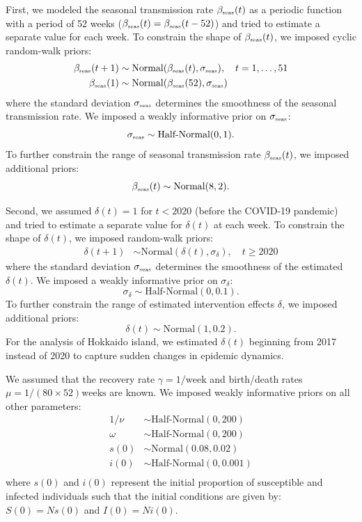 \documentclass[12pt]{article}
\newcommand{\tsub}[2]{#1_{{\textrm{\tiny #2}}}}
\begin{document}
First, we modeled the seasonal transmission rate $\tsub{\beta}{seas}(t)$ as a periodic function with a period of 52 weeks ($\tsub{\beta}{seas}(t) = \tsub{\beta}{seas}(t-52)$) and tried to estimate a separate value for each week.
To constrain the shape of $\tsub{\beta}{seas}(t)$, we imposed cyclic random-walk priors:
\begin{align}
\tsub{\beta}{seas}(t+1) &\sim \mathrm{Normal}(\tsub{\beta}{seas}(t), \tsub{\sigma}{seas}), \quad t=1,\dots,51  \\
\tsub{\beta}{seas}(1) &\sim \mathrm{Normal}(\tsub{\beta}{seas}(52), \tsub{\sigma}{seas})
\end{align}
where the standard deviation $\tsub{\sigma}{seas}$ determines the smoothness of the seasonal transmission rate.
We imposed a weakly informative prior on $\tsub{\sigma}{seas}$:
\begin{equation}
\tsub{\sigma}{seas} \sim \textrm{Half-Normal}(0, 1).
\end{equation}
To further constrain the range of seasonal transmission rate $\tsub{\beta}{seas}(t)$, we imposed additional priors:
\begin{equation}
\tsub{\beta}{seas}(t) \sim \mathrm{Normal}(8, 2).
\end{equation}

Second, we assumed $\delta(t) = 1$ for $t < 2020$ (before the COVID-19 pandemic) and tried to estimate a separate value for $\delta(t)$ at each week.
To constrain the shape of $\delta(t)$, we imposed random-walk priors:
\begin{align}
\delta(t+1) &\sim \mathrm{Normal}(\delta(t), \sigma_\delta), \quad t \geq 2020
\end{align}
where the standard deviation $\tsub{\sigma}{seas}$ determines the smoothness of the estimated $\delta(t)$.
We imposed a weakly informative prior on $\sigma_\delta$:
\begin{equation}
\sigma_\delta \sim \textrm{Half-Normal}(0, 0.1).
\end{equation}
To further constrain the range of estimated intervention effects $\delta$, we imposed additional priors:
\begin{equation}
\delta(t) \sim \mathrm{Normal}(1, 0.2).
\end{equation}
For the analysis of Hokkaido island, we estimated $\delta(t)$ beginning from 2017 instead of 2020 to capture sudden changes in epidemic dynamics.

We assumed that the recovery rate $\gamma = 1/\mathrm{week}$ and birth/death rates $\mu = 1/(80\times 52)\mathrm{weeks}$ are known.
We imposed weakly informative priors on all other parameters:
\begin{align}
1/\nu &\sim \textrm{Half-Normal}(0, 200)\\
\omega &\sim \textrm{Half-Normal}(0, 200)\\
s(0) &\sim \textrm{Normal}(0.08, 0.02)\\
i(0) &\sim \textrm{Half-Normal}(0, 0.001)\\
\end{align}
where $s(0)$ and $i(0)$ represent the initial proportion of susceptible and infected individuals such that the initial conditions are given by: $S(0) = Ns(0)$ and $I(0) = N i(0)$.
\end{document}
